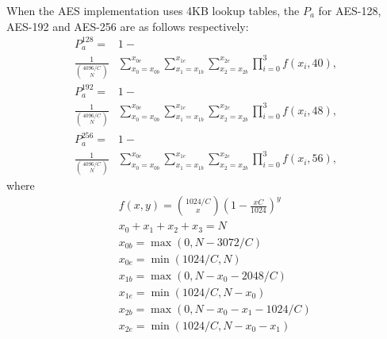 When the AES implementation uses 4KB lookup tables, the $P_{a}$ for AES-128, AES-192 and AES-256 are as follows respectively:
\begin{align}
    P_{a}^{128} = &1-   \nonumber \\
    \frac{1}{\binom{4096/C}{N}}&\sum_{x_0=x_{0b}}^{x_{0e}}{\sum_{x_1=x_{1b}}^{x_{1e}}{\sum_{x_2=x_{2b}}^{x_{2e}}{\prod_{i=0}^{3}{f(x_i,40)}}}}, \nonumber
\end{align}
\begin{align}
    P_{a}^{192} = &1-  \nonumber \\
    \frac{1}{\binom{4096/C}{N}}&\sum_{x_0=x_{0b}}^{x_{0e}}{\sum_{x_1=x_{1b}}^{x_{1e}}{\sum_{x_2=x_{2b}}^{x_{2e}}{\prod_{i=0}^{3}{f(x_i,48)}}}}, \nonumber
\end{align}
\begin{align}
    P_{a}^{256} = &1-  \nonumber \\
    \frac{1}{\binom{4096/C}{N}}&\sum_{x_0=x_{0b}}^{x_{0e}}{\sum_{x_1=x_{1b}}^{x_{1e}}{\sum_{x_2=x_{2b}}^{x_{2e}}{\prod_{i=0}^{3}{f(x_i,56)}}}}, \nonumber
\end{align}
where
  \begin{eqnarray*}
    &&f(x,y) = \binom{1024/C}{x}(1-\frac{xC}{1024})^{y} \\
    &&x_0+x_1+x_2+x_3 = N \\
    &&x_{0b} = \max(0,N-3072/C) \\
    &&x_{0e} = \min(1024/C,N) \\
    &&x_{1b} = \max(0,N-x_0-2048/C) \\
    &&x_{1e} = \min(1024/C,N-x_0) \\
    &&x_{2b} = \max(0,N-x_0-x_1-1024/C) \\
    &&x_{2e} = \min(1024/C,N-x_0-x_1)
  \end{eqnarray*}


